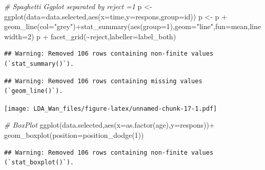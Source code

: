 \documentclass[
]{article}
\newenvironment{Shaded}{\begin{snugshade}}{\end{snugshade}}
\newcommand{\AttributeTok}[1]{\textcolor[rgb]{0.77,0.63,0.00}{#1}}
\newcommand{\CommentTok}[1]{\textcolor[rgb]{0.56,0.35,0.01}{\textit{#1}}}
\newcommand{\DecValTok}[1]{\textcolor[rgb]{0.00,0.00,0.81}{#1}}
\newcommand{\FunctionTok}[1]{\textcolor[rgb]{0.00,0.00,0.00}{#1}}
\newcommand{\NormalTok}[1]{#1}
\newcommand{\OtherTok}[1]{\textcolor[rgb]{0.56,0.35,0.01}{#1}}
\newcommand{\SpecialCharTok}[1]{\textcolor[rgb]{0.00,0.00,0.00}{#1}}
\newcommand{\StringTok}[1]{\textcolor[rgb]{0.31,0.60,0.02}{#1}}
\begin{document}
\begin{Shaded}
\begin{Highlighting}[]
\CommentTok{\# Spaghetti Ggplot separated by reject =1}
\NormalTok{p }\OtherTok{\textless{}{-}} \FunctionTok{ggplot}\NormalTok{(}\AttributeTok{data=}\NormalTok{data.selected,}\FunctionTok{aes}\NormalTok{(}\AttributeTok{x=}\NormalTok{time,}\AttributeTok{y=}\NormalTok{respons,}\AttributeTok{group=}\NormalTok{id))}
\NormalTok{p }\OtherTok{\textless{}{-}}\NormalTok{ p }\SpecialCharTok{+} \FunctionTok{geom\_line}\NormalTok{(}\AttributeTok{col=}\StringTok{"grey"}\NormalTok{)}\SpecialCharTok{+}\FunctionTok{stat\_summary}\NormalTok{(}\FunctionTok{aes}\NormalTok{(}\AttributeTok{group=}\DecValTok{1}\NormalTok{),}\AttributeTok{geom=}\StringTok{"line"}\NormalTok{,}\AttributeTok{fun=}\NormalTok{mean,}\AttributeTok{linewidth=}\DecValTok{2}\NormalTok{)}
\NormalTok{p }\SpecialCharTok{+} \FunctionTok{facet\_grid}\NormalTok{(}\SpecialCharTok{\textasciitilde{}}\NormalTok{reject,}\AttributeTok{labeller=}\NormalTok{label\_both)}
\end{Highlighting}
\end{Shaded}

\begin{verbatim}
## Warning: Removed 106 rows containing non-finite values (`stat_summary()`).
\end{verbatim}

\begin{verbatim}
## Warning: Removed 106 rows containing missing values (`geom_line()`).
\end{verbatim}

\texttt{[image: LDA\_Wan\_files/figure-latex/unnamed-chunk-17-1.pdf]}

\begin{Shaded}
\begin{Highlighting}[]
\CommentTok{\# BoxPlot}
\FunctionTok{ggplot}\NormalTok{(data.selected,}\FunctionTok{aes}\NormalTok{(}\AttributeTok{x=}\FunctionTok{as.factor}\NormalTok{(age),}\AttributeTok{y=}\NormalTok{respons))}\SpecialCharTok{+} \FunctionTok{geom\_boxplot}\NormalTok{(}\AttributeTok{position=}\FunctionTok{position\_dodge}\NormalTok{(}\DecValTok{1}\NormalTok{))}
\end{Highlighting}
\end{Shaded}

\begin{verbatim}
## Warning: Removed 106 rows containing non-finite values (`stat_boxplot()`).
\end{verbatim}
\end{document}
